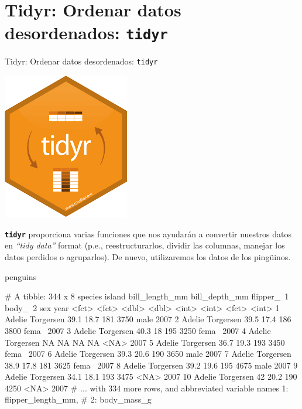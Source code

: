 \documentclass[
  ignorenonframetext,
  aspectratio=169]{beamer}
\newenvironment{Shaded}{\begin{snugshade}}{\end{snugshade}}
\newcommand{\NormalTok}[1]{#1}
\let\oldverbatim\verbatim
\let\endoldverbatim\endverbatim
\renewenvironment{verbatim}{\tiny\oldverbatim}{\endoldverbatim}
\begin{document}
\hypertarget{tidyr-ordenar-datos-desordenados-tidyr}{%
\section{\texorpdfstring{Tidyr: Ordenar datos desordenados:
\texttt{tidyr}}{Tidyr: Ordenar datos desordenados: tidyr}}\label{tidyr-ordenar-datos-desordenados-tidyr}}

\begin{frame}[fragile]{Tidyr: Ordenar datos desordenados:
\texttt{tidyr}}
\begin{flushright}\includegraphics[width=0.05\linewidth]{Imgs/logo_tidyr} \end{flushright}

\textbf{\texttt{tidyr}} proporciona varias funciones que nos ayudarán a
convertir nuestros datos en \emph{``tidy data''} format (p.e.,
reestructurarlos, dividir las columnas, manejar los datos perdidos o
agruparlos). De nuevo, utilizaremos los datos de los pingüinos.

\begin{Shaded}
\begin{Highlighting}[]
\NormalTok{penguins}
\end{Highlighting}
\end{Shaded}

\begin{verbatim}
# A tibble: 344 x 8
   species island    bill_length_mm bill_depth_mm flipper_~1 body_~2 sex    year
   <fct>   <fct>              <dbl>         <dbl>      <int>   <int> <fct> <int>
 1 Adelie  Torgersen           39.1          18.7        181    3750 male   2007
 2 Adelie  Torgersen           39.5          17.4        186    3800 fema~  2007
 3 Adelie  Torgersen           40.3          18          195    3250 fema~  2007
 4 Adelie  Torgersen           NA            NA           NA      NA <NA>   2007
 5 Adelie  Torgersen           36.7          19.3        193    3450 fema~  2007
 6 Adelie  Torgersen           39.3          20.6        190    3650 male   2007
 7 Adelie  Torgersen           38.9          17.8        181    3625 fema~  2007
 8 Adelie  Torgersen           39.2          19.6        195    4675 male   2007
 9 Adelie  Torgersen           34.1          18.1        193    3475 <NA>   2007
10 Adelie  Torgersen           42            20.2        190    4250 <NA>   2007
# ... with 334 more rows, and abbreviated variable names 1: flipper_length_mm,
#   2: body_mass_g
\end{verbatim}
\end{frame}
\end{document}
